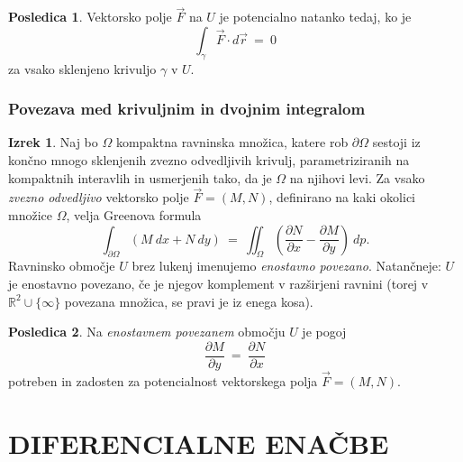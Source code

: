 \documentclass[11pt]{article}
\theoremstyle{definition}
\theoremstyle{definition}
\theoremstyle{definition}
\newtheorem{izrek}{Izrek}[section]
\newtheorem*{posledica}{Posledica}
\begin{document}
\begin{posledica}

Vektorsko polje $\vec{F}$ na $U$ je potencialno natanko tedaj, ko je 
$$\int_{\gamma} \vec{F} \cdot d\vec{r} ~=~ 0$$
za vsako sklenjeno krivuljo $\gamma$ v $U$.

\end{posledica}
\vspace{0.5cm}

\subsubsection{Povezava med krivuljnim in dvojnim integralom}

\begin{izrek}

Naj bo $\Omega$ kompaktna ravninska množica, katere rob $\partial \Omega$ sestoji iz končno mnogo sklenjenih zvezno odvedljivih krivulj, parametriziranih na kompaktnih interavlih in usmerjenih tako, da je $\Omega$ na njihovi levi. Za vsako \textit{zvezno odvedljivo} vektorsko polje $\vec{F} = (M, N)$, definirano na kaki okolici množice $\Omega$, velja Greenova formula
$$\int_{\partial \Omega} (M~dx + N~dy) ~=~ \iint_{\Omega} \left( \frac{\partial N}{\partial x} - \frac{\partial M}{\partial y} \right)~dp.$$
Ravninsko območje $U$ brez lukenj imenujemo \textit{enostavno povezano}. Natančneje: $U$ je enostavno povezano, če je njegov komplement v razširjeni ravnini (torej v $\mathbb{R}^2 \cup \{\infty\}$ povezana množica, se pravi je iz enega kosa).

\end{izrek}
\vspace{0.5cm}

\begin{posledica}

Na \textit{enostavnem povezanem} območju $U$ je pogoj 
$$\frac{\partial M}{\partial y} ~=~ \frac{\partial N}{\partial x}$$
potreben in zadosten za potencialnost vektorskega polja $\vec{F} = (M, N)$.

\end{posledica}
\vspace{0.5cm}


\pagebreak


\section{DIFERENCIALNE ENAČBE}
\vspace{0.5cm}
\end{document}
